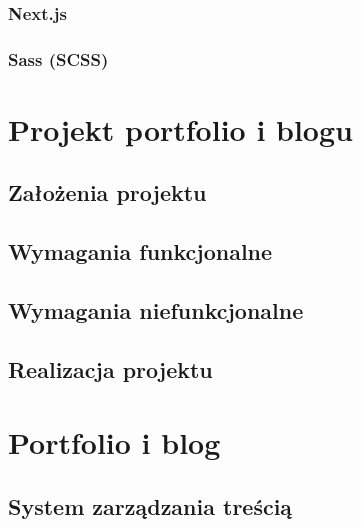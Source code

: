 \documentclass[12pt]{article}
\numberwithin{figure}{section}
\begin{document}
\begin{sloppypar}

\subsubsection{Next.js}


\subsubsection{Sass (SCSS)}


\newpage 

\section{Projekt portfolio i blogu} \label{wymagania}


\subsection{Założenia projektu}


\subsection{Wymagania funkcjonalne}


\subsection{Wymagania niefunkcjonalne}



\subsection{Realizacja projektu}


\newpage

\section{Portfolio i blog}


\subsection{System zarządzania treścią}



\end{sloppypar}
\end{document}
